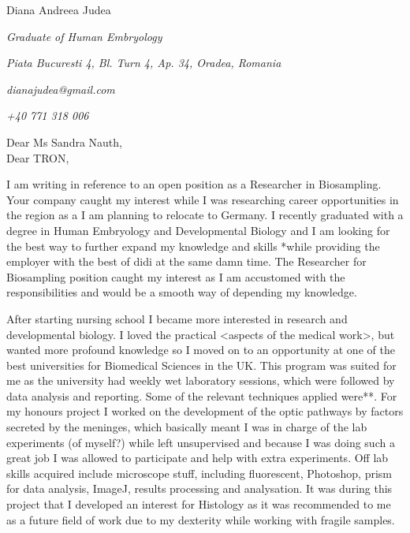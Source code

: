 \documentclass[paper=a4,fontsize=11pt]{scrartcl} %
\newcommand{\sepspace}{\vspace*{1em}}		%
\newcommand{\MyName}[1]{ %
  \Huge \usefont{OT1}{phv}{b}{n} \hfill #1
  \par \normalsize \normalfont}
\newcommand{\MySlogan}[4]{ %
  \large \usefont{OT1}{phv}{m}{n}\hfill \textit{#1} 
  \sepspace
  \par \normalsize \usefont{OT1}{phv}{m}{n}\hfill \textit{#2}
  \par \normalsize \usefont{OT1}{phv}{m}{n}\hfill \textit{#3}
  \par \normalsize \usefont{OT1}{phv}{m}{n}\hfill \textit{#4}
  \par \normalsize \normalfont}
\begin{document}
  
  \MyName{Diana Andreea Judea}
  \MySlogan{Graduate of Human Embryology}{Piata Bucuresti 4, Bl. Turn 4, Ap. 34, Oradea, Romania}{dianajudea@gmail.com}{+40 771 318 006}
  \sepspace \sepspace
  
  \noindent
  Dear Ms Sandra Nauth, \\
  Dear TRON,

  \sepspace
  
  \noindent
  I am writing in reference to an open position as a Researcher in
  Biosampling.  Your company caught my interest while I was researching career
  opportunities in the region as a I am planning to relocate to Germany.  I
  recently graduated with a degree in Human Embryology and Developmental
  Biology and I am looking for the best way to further expand my knowledge and
  skills *while providing the employer with the best of didi at the same damn
  time.  The Researcher for Biosampling position caught my interest as I am
  accustomed with the responsibilities and would be a smooth way of depending
  my knowledge.
  \sepspace
  
  \noindent 
  After starting nursing school I became more interested in research and
  developmental biology.  I loved the practical <aspects of the medical work>,
  but wanted more profound knowledge so I moved on to an opportunity at one of the
  best universities for Biomedical Sciences in the UK.  This program was suited
  for me as the university had weekly wet laboratory sessions, which were
  followed by data analysis and reporting.  Some of the relevant techniques
  applied were**.  For my honours project I worked on the development of the
  optic pathways by factors secreted by the meninges, which basically meant I
  was in charge of the lab experiments (of myself?) while left unsupervised and
  because I was doing such a great job I was allowed to participate and help
  with extra experiments.  Off lab skills acquired include microscope stuff,
  including fluorescent, Photoshop, prism for data analysis, ImageJ, results
  processing and analysation.  It was during this project that I developed an
  interest for Histology as it was recommended to me as a future field of work
  due to my dexterity while working with fragile samples.
  \sepspace
\end{document}
